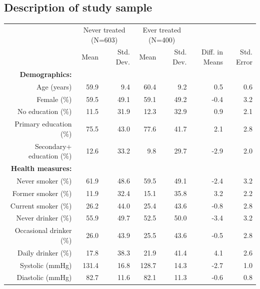 \documentclass[
  letterpaper,
  DIV=11,
  numbers=noendperiod]{scrartcl}
\makeatletter
\renewenvironment{table}%
   {\renewcommand\familydefault\sfdefault
    \@float{table}}
   {\end@float}
\makeatother
\begin{document}
\hypertarget{description-of-study-sample}{%
\subsection{Description of study
sample}\label{description-of-study-sample}}

\hypertarget{tbl-table1}{}
\begin{table}
\caption{\label{tbl-table1}Descriptive statistics for selected demographic, health, and
environmental measures at baseline, by treatment status }\tabularnewline

\centering\centering
\fontsize{9}{11}\selectfont
\begin{tabular}[t]{rrrrrrr}
\toprule
\multicolumn{1}{c}{ } & \multicolumn{2}{c}{Never treated (N=603)} & \multicolumn{2}{c}{Ever treated (N=400)} & \multicolumn{2}{c}{ } \\
\cmidrule(l{3pt}r{3pt}){2-3} \cmidrule(l{3pt}r{3pt}){4-5}
  & Mean & Std. Dev. & Mean & Std. Dev. & Diff. in Means & Std. Error\\
\midrule
\textbf{Demographics:} & \textbf{} & \textbf{} & \textbf{} & \textbf{} & \textbf{} & \textbf{}\\
Age (years) & 59.9 & 9.4 & 60.4 & 9.2 & 0.5 & 0.6\\
Female (\%) & 59.5 & 49.1 & 59.1 & 49.2 & -0.4 & 3.2\\
No education (\%) & 11.5 & 31.9 & 12.3 & 32.9 & 0.9 & 2.1\\
Primary education (\%) & 75.5 & 43.0 & 77.6 & 41.7 & 2.1 & 2.8\\
Secondary+ education (\%) & 12.6 & 33.2 & 9.8 & 29.7 & -2.9 & 2.0\\
\textbf{Health measures:} & \textbf{} & \textbf{} & \textbf{} & \textbf{} & \textbf{} & \textbf{}\\
Never smoker (\%) & 61.9 & 48.6 & 59.5 & 49.1 & -2.4 & 3.2\\
Former smoker (\%) & 11.9 & 32.4 & 15.1 & 35.8 & 3.2 & 2.2\\
Current smoker (\%) & 26.2 & 44.0 & 25.4 & 43.6 & -0.8 & 2.8\\
Never drinker (\%) & 55.9 & 49.7 & 52.5 & 50.0 & -3.4 & 3.2\\
Occasional drinker (\%) & 26.0 & 43.9 & 25.5 & 43.6 & -0.5 & 2.8\\
Daily drinker (\%) & 17.8 & 38.3 & 21.9 & 41.4 & 4.1 & 2.6\\
Systolic (mmHg) & 131.4 & 16.8 & 128.7 & 14.3 & -2.7 & 1.0\\
Diastolic (mmHg) & 82.7 & 11.6 & 82.1 & 11.3 & -0.6 & 0.8\\

\end{tabular}
\end{table}
\end{document}
